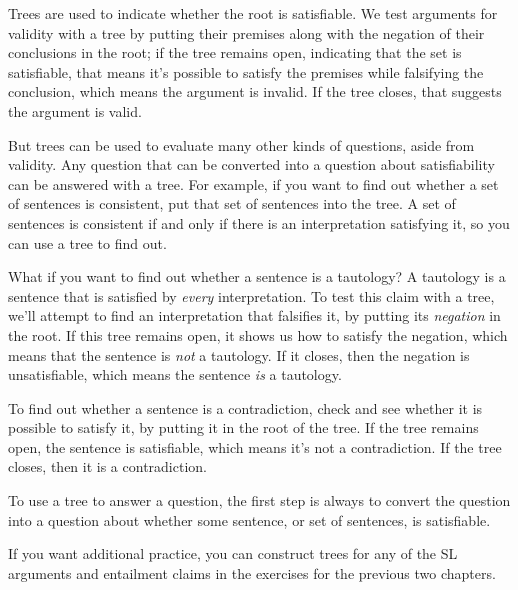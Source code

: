 Trees are used to indicate whether the root is satisfiable. We test arguments for validity with a tree by putting their premises along with the negation of their conclusions in the root; if the tree remains open, indicating that the set is satisfiable, that means it's possible to satisfy the premises while falsifying the conclusion, which means the argument is invalid. If the tree closes, that suggests the argument is valid.

But trees can be used to evaluate many other kinds of questions, aside from validity. Any question that can be converted into a question about satisfiability can be answered with a tree. For example, if you want to find out whether a set of sentences is consistent, put that set of sentences into the tree. A set of sentences is consistent if and only if there is an interpretation satisfying it, so you can use a tree to find out.

What if you want to find out whether a sentence is a tautology? A tautology is a sentence that is satisfied by \emph{every} interpretation. To test this claim with a tree, we'll attempt to find an interpretation that falsifies it, by putting its \emph{negation} in the root. If this tree remains open, it shows us how to satisfy the negation, which means that the sentence is \emph{not} a tautology. If it closes, then the negation is unsatisfiable, which means the sentence \emph{is} a tautology.

To find out whether a sentence is a contradiction, check and see whether it is possible to satisfy it, by putting it in the root of the tree. If the tree remains open, the sentence is satisfiable, which means it's not a contradiction. If the tree closes, then it is a contradiction.

To use a tree to answer a question, the first step is always to convert the question into a question about whether some sentence, or set of sentences, is satisfiable. 


\practiceproblems
If you want additional practice, you can construct trees for any of the SL arguments and entailment claims in the exercises for the previous two chapters.

